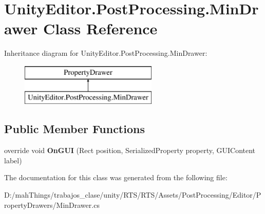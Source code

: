 \hypertarget{class_unity_editor_1_1_post_processing_1_1_min_drawer}{}\section{Unity\+Editor.\+Post\+Processing.\+Min\+Drawer Class Reference}
\label{class_unity_editor_1_1_post_processing_1_1_min_drawer}
Inheritance diagram for Unity\+Editor.\+Post\+Processing.\+Min\+Drawer\+:\begin{figure}[H]
\begin{center}
\leavevmode
\includegraphics[height=2.000000cm]{class_unity_editor_1_1_post_processing_1_1_min_drawer}
\end{center}
\end{figure}
\subsection*{Public Member Functions}
\begin{DoxyCompactItemize}
\item 
\mbox{\label{class_unity_editor_1_1_post_processing_1_1_min_drawer_ad2ca5ec821cabdc3ca03f592c3404949}} 
override void {\bfseries On\+G\+UI} (Rect position, Serialized\+Property property, G\+U\+I\+Content label)
\end{DoxyCompactItemize}


The documentation for this class was generated from the following file\+:\begin{DoxyCompactItemize}
\item 
D\+:/mah\+Things/trabajos\+\_\+clase/unity/\+R\+T\+S/\+R\+T\+S/\+Assets/\+Post\+Processing/\+Editor/\+Property\+Drawers/Min\+Drawer.\+cs\end{DoxyCompactItemize}
